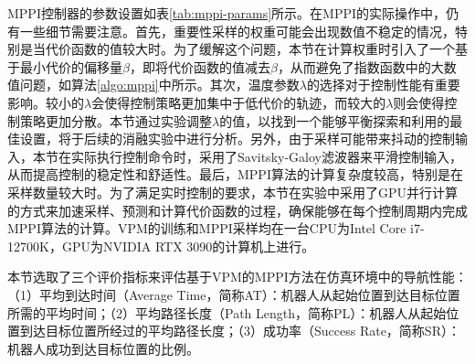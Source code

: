 MPPI控制器的参数设置如表\ref{tab:mppi-params}所示。在MPPI的实际操作中，仍有一些细节需要注意。首先，重要性采样的权重可能会出现数值不稳定的情况，特别是当代价函数的值较大时。为了缓解这个问题，本节在计算权重时引入了一个基于最小代价的偏移量$\beta$，即将代价函数的值减去$\beta$，从而避免了指数函数中的大数值问题，如算法\ref{algo:mppi}中所示。其次，温度参数$\lambda$的选择对于控制性能有重要影响。较小的$\lambda$会使得控制策略更加集中于低代价的轨迹，而较大的$\lambda$则会使得控制策略更加分散。本节通过实验调整$\lambda$的值，以找到一个能够平衡探索和利用的最佳设置，将于后续的消融实验中进行分析。另外，由于采样可能带来抖动的控制输入，本节在实际执行控制命令时，采用了Savitsky-Galoy滤波器\cite{savitzky1964smoothing}来平滑控制输入，从而提高控制的稳定性和舒适性。最后，MPPI算法的计算复杂度较高，特别是在采样数量较大时。为了满足实时控制的要求，本节在实验中采用了GPU并行计算的方式来加速采样、预测和计算代价函数的过程，确保能够在每个控制周期内完成MPPI算法的计算。VPM的训练和MPPI采样均在一台CPU为Intel Core i7-12700K，GPU为NVIDIA RTX 3090的计算机上进行。

本节选取了三个评价指标来评估基于VPM的MPPI方法在仿真环境中的导航性能：（1）平均到达时间（Average Time，简称AT）：机器人从起始位置到达目标位置所需的平均时间；（2）平均路径长度（Path Length，简称PL）：机器人从起始位置到达目标位置所经过的平均路径长度；（3）成功率（Success Rate，简称SR）：机器人成功到达目标位置的比例。

